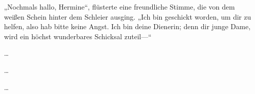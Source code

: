 „Nochmals hallo, Hermine“, flüsterte eine freundliche Stimme, die von dem weißen Schein hinter dem Schleier ausging. „Ich bin geschickt worden, um dir zu helfen, also hab bitte keine Angst. Ich bin deine Dienerin; denn dir junge Dame, wird ein höchst wunderbares Schicksal zuteil—“

\begin{center}
…

…

…
\end{center}

